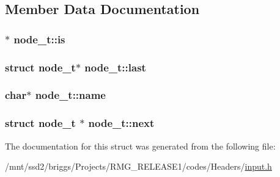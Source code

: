 \subsection{Member Data Documentation}
\hypertarget{structnode__t_a382fa3f6173e83140aaa7b03d23676d9}{
\subsubsection[{is}]{$\ast$ node\-\_\-t\-::is}}\label{structnode__t_a382fa3f6173e83140aaa7b03d23676d9}
\hypertarget{structnode__t_a899e09e88ee2875bcb67c83fcf1f5510}{
\subsubsection[{last}]{\setlength{\rightskip}{0pt plus 5cm}struct {\bf node\-\_\-t}$\ast$ node\-\_\-t\-::last}}\label{structnode__t_a899e09e88ee2875bcb67c83fcf1f5510}
\hypertarget{structnode__t_a84f8212d7d9b2f1e6aa5b44889685fdf}{
\subsubsection[{name}]{\setlength{\rightskip}{0pt plus 5cm}char$\ast$ node\-\_\-t\-::name}}\label{structnode__t_a84f8212d7d9b2f1e6aa5b44889685fdf}
\hypertarget{structnode__t_a8d56a134e4eebf92f303fb09f89dc73e}{
\subsubsection[{next}]{\setlength{\rightskip}{0pt plus 5cm}struct {\bf node\-\_\-t} $\ast$ node\-\_\-t\-::next}}\label{structnode__t_a8d56a134e4eebf92f303fb09f89dc73e}


The documentation for this struct was generated from the following file\-:\begin{DoxyCompactItemize}
\item 
/mnt/ssd2/briggs/\-Projects/\-R\-M\-G\-\_\-\-R\-E\-L\-E\-A\-S\-E1/codes/\-Headers/\hyperlink{input_8h}{input.\-h}\end{DoxyCompactItemize}
